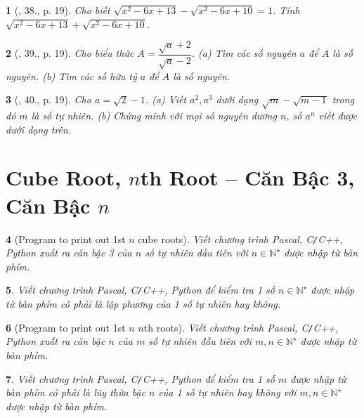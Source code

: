 \documentclass{article}
\newtheorem{baitoan}{}%
\begin{document}
\begin{baitoan}[\cite{Binh_Toan_9_tap_1}, 38., p. 19]
	Cho biết $\sqrt{x^2 - 6x + 13} - \sqrt{x^2 - 6x + 10} = 1$. Tính $\sqrt{x^2 - 6x + 13} + \sqrt{x^2 - 6x + 10}$.
\end{baitoan}

\begin{baitoan}[\cite{Binh_Toan_9_tap_1}, 39., p. 19]
	Cho biểu thức $A = \dfrac{\sqrt{a} + 2}{\sqrt{a} - 2}$. (a) Tìm các số nguyên $a$ để $A$ là số nguyên. (b) Tìm các số hữu tỷ $a$ để $A$ là số nguyên.
\end{baitoan}

\begin{baitoan}[\cite{Binh_Toan_9_tap_1}, 40., p. 19]
	Cho $a = \sqrt{2} - 1$. (a) Viết $a^2,a^3$ dưới dạng $\sqrt{m} - \sqrt{m - 1}$ trong đó $m$ là số tự nhiên. (b) Chứng minh với mọi số nguyên dương $n$, số $a^n$ viết được dưới dạng trên.
\end{baitoan}


\section{Cube Root, $n$th Root -- Căn Bậc 3, Căn Bậc $n$}

\begin{baitoan}[Program to print out 1st $n$ cube roots]
	Viết chương trình {\sf Pascal, C\texttt{/}C++, Python} xuất ra căn bậc 3 của $n$ số tự nhiên đầu tiên với $n\in\mathbb{N}^\star$ được nhập từ bàn phím.
\end{baitoan}

\begin{baitoan}
	Viết chương trình {\sf Pascal, C\texttt{/}C++, Python} để kiểm tra 1 số $n\in\mathbb{N}^\star$ được nhập từ bàn phím có phải là lập phương của 1 số tự nhiên hay không.
\end{baitoan}

\begin{baitoan}[Program to print out 1st $n$ $n$th roots]
	Viết chương trình {\sf Pascal, C\texttt{/}C++, Python} xuất ra căn bậc $n$ của $m$ số tự nhiên đầu tiên với $m,n\in\mathbb{N}^\star$ được nhập từ bàn phím.
\end{baitoan}

\begin{baitoan}
	Viết chương trình {\sf Pascal, C\texttt{/}C++, Python} để kiểm tra 1 số $m$ được nhập từ bàn phím có phải là lũy thừa bậc $n$ của 1 số tự nhiên hay không với $m,n\in\mathbb{N}^\star$ được nhập từ bàn phím.
\end{baitoan}
\end{document}
